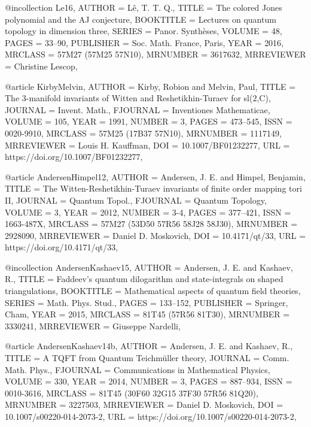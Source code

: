 @incollection {Le16,
    AUTHOR = {L\^{e}, T. T. Q.},
     TITLE = {The colored {J}ones polynomial and the {AJ} conjecture},
 BOOKTITLE = {Lectures on quantum topology in dimension three},
    SERIES = {Panor. Synth\`eses},
    VOLUME = {48},
     PAGES = {33--90},
 PUBLISHER = {Soc. Math. France, Paris},
      YEAR = {2016},
   MRCLASS = {57M27 (57M25 57N10)},
  MRNUMBER = {3617632},
MRREVIEWER = {Christine Lescop},
}

@article {KirbyMelvin,
    AUTHOR = {Kirby, Robion and Melvin, Paul},
     TITLE = {The {$3$}-manifold invariants of {W}itten and
              {R}eshetikhin-{T}uraev for sl($2$,C)},
   JOURNAL = {Invent. Math.},
  FJOURNAL = {Inventiones Mathematicae},
    VOLUME = {105},
      YEAR = {1991},
    NUMBER = {3},
     PAGES = {473--545},
      ISSN = {0020-9910},
   MRCLASS = {57M25 (17B37 57N10)},
  MRNUMBER = {1117149},
MRREVIEWER = {Louis H. Kauffman},
       DOI = {10.1007/BF01232277},
       URL = {https://doi.org/10.1007/BF01232277},
}

@article {AndersenHimpel12,
    AUTHOR = {Andersen, J. E. and Himpel, Benjamin},
     TITLE = {The {W}itten-{R}eshetikhin-{T}uraev invariants of finite order
              mapping tori {II}},
   JOURNAL = {Quantum Topol.},
  FJOURNAL = {Quantum Topology},
    VOLUME = {3},
      YEAR = {2012},
    NUMBER = {3-4},
     PAGES = {377--421},
      ISSN = {1663-487X},
   MRCLASS = {57M27 (53D50 57R56 58J28 58J30)},
  MRNUMBER = {2928090},
MRREVIEWER = {Daniel D. Moskovich},
       DOI = {10.4171/qt/33},
       URL = {https://doi.org/10.4171/qt/33},
}

@incollection {AndersenKashaev15,
    AUTHOR = {Andersen, J. E. and Kashaev, R.},
     TITLE = {Faddeev's quantum dilogarithm and state-integrals on shaped
              triangulations},
 BOOKTITLE = {Mathematical aspects of quantum field theories},
    SERIES = {Math. Phys. Stud.},
     PAGES = {133--152},
 PUBLISHER = {Springer, Cham},
      YEAR = {2015},
   MRCLASS = {81T45 (57R56 81T30)},
  MRNUMBER = {3330241},
MRREVIEWER = {Giuseppe Nardelli},
}

@article {AndersenKashaev14b,
    AUTHOR = {Andersen, J. E. and Kashaev, R.},
     TITLE = {A {TQFT} from {Q}uantum {T}eichm\"{u}ller theory},
   JOURNAL = {Comm. Math. Phys.},
  FJOURNAL = {Communications in Mathematical Physics},
    VOLUME = {330},
      YEAR = {2014},
    NUMBER = {3},
     PAGES = {887--934},
      ISSN = {0010-3616},
   MRCLASS = {81T45 (30F60 32G15 37F30 57R56 81Q20)},
  MRNUMBER = {3227503},
MRREVIEWER = {Daniel D. Moskovich},
       DOI = {10.1007/s00220-014-2073-2},
       URL = {https://doi.org/10.1007/s00220-014-2073-2},
}

